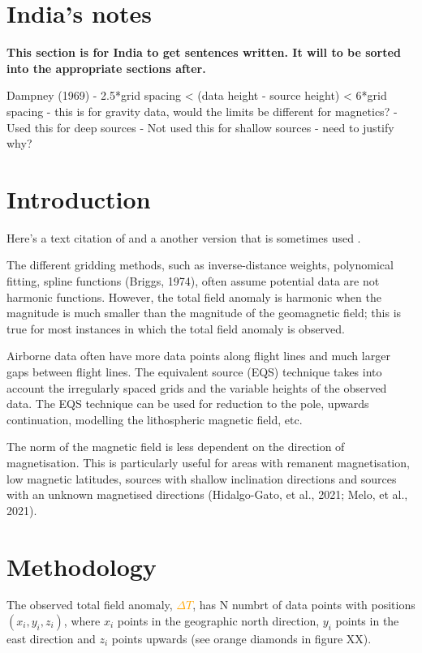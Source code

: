 \section{India's notes}
\textbf{This section is for India to get sentences written. It will to be sorted into the appropriate sections after.}

Dampney (1969)
- 2.5*grid spacing < (data height - source height) < 6*grid spacing
    - this is for gravity data, would the limits be different for magnetics?
    - Used this for deep sources
    - Not used this for shallow sources - need to justify why?




\section{Introduction}

Here's a text citation of \citet{OliveiraJr2015}
and a another version that is sometimes used \citep{OliveiraJr2015}.

The different gridding methods, such as inverse-distance weights, polynomical fitting, spline functions (Briggs, 1974), often assume potential data are not harmonic functions. However, the total field anomaly is harmonic when the magnitude is much smaller than the magnitude of the geomagnetic field; this is true for most instances in which the total field anomaly is observed. 

Airborne data often have more data points along flight lines and much larger gaps between flight lines. The equivalent source (EQS) technique takes into account the irregularly spaced grids and the variable heights of the observed data. The EQS technique can be used for reduction to the pole, upwards continuation, modelling the lithospheric magnetic field, etc.

The norm of the magnetic field is less dependent on the direction of magnetisation. This is particularly useful for areas with remanent magnetisation, low magnetic latitudes, sources with shallow inclination directions and sources with an unknown magnetised directions (Hidalgo-Gato, et al., 2021; Melo, et al., 2021).


\section{Methodology}
The observed total field anomaly, \textcolor{orange}{$\Delta T$}, has N numbrt of data points with positions $(x_i, y_i, z_i)$, where $x_i$ points in the geographic north direction, $y_i$ points in the east direction and $z_i$ points upwards (see orange diamonds in figure XX).


